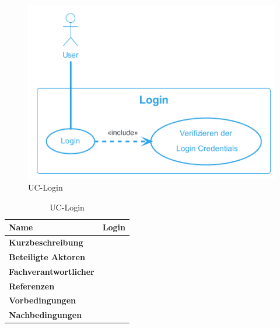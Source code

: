 \begin{figure}[H]
  \begin{center}
    \includegraphics[width=0.6\linewidth]{content/diagrams/out/usecase/login/Login.png}
    \caption{UC-Login}
  \end{center}
  \label{login}
\end{figure}

\begin{table}[H]
  \centering
  \settowidth{}
  \setlength\extrarowheight{2pt}
  \begin{tabulary}{1.0\textwidth}{|a|m{12cm}|}
    \hline
    \textbf{Name}& Login\\
    \hline 
    \textbf{Kurzbeschreibung} & \\
    \hline
    \textbf{Beteiligte Aktoren} & \\
    \hline
    \textbf{Fachverantwortlicher} & \\
    \hline
    \textbf{Referenzen} & \\
    \hline
    \textbf{Vorbedingungen} & \\
    \hline
    \textbf{Nachbedingungen} & \\
    \hline
  \end{tabulary}
  \caption{UC-Login}
\end{table}

